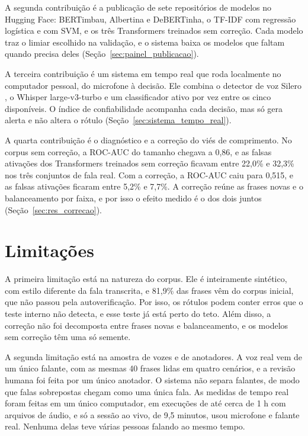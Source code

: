 \documentclass[
    12pt,                %
    openright,           %
    oneside,             %
    a4paper,             %
    english,             %
    brazil               %
]{abntex2}
\begin{document}
A segunda contribuição é a publicação de sete repositórios de modelos no Hugging Face: BERTimbau, Albertina e DeBERTinha, o TF-IDF com regressão logística e com SVM, e os três Transformers treinados sem correção. Cada modelo traz o limiar escolhido na validação, e o sistema baixa os modelos que faltam quando precisa deles (Seção~\ref{sec:painel_publicacao}).

A terceira contribuição é um sistema em tempo real que roda localmente no computador pessoal, do microfone à decisão. Ele combina o detector de voz Silero \cite{Silero2026}, o Whisper large-v3-turbo \cite{Radford2023, OpenAI2024Turbo} e um classificador ativo por vez entre os cinco disponíveis. O índice de confiabilidade acompanha cada decisão, mas só gera alerta e não altera o rótulo (Seção~\ref{sec:sistema_tempo_real}).

A quarta contribuição é o diagnóstico e a correção do viés de comprimento. No corpus sem correção, a ROC-AUC do tamanho chegava a 0,86, e as falsas ativações dos Transformers treinados sem correção ficavam entre 22,0\% e 32,3\% nos três conjuntos de fala real. Com a correção, a ROC-AUC caiu para 0,515, e as falsas ativações ficaram entre 5,2\% e 7,7\%. A correção reúne as frases novas e o balanceamento por faixa, e por isso o efeito medido é o dos dois juntos (Seção~\ref{sec:res_correcao}).


\section{Limitações}

A primeira limitação está na natureza do corpus. Ele é inteiramente sintético, com estilo diferente da fala transcrita, e 81,9\% das frases vêm do corpus inicial, que não passou pela autoverificação. Por isso, os rótulos podem conter erros que o teste interno não detecta, e esse teste já está perto do teto. Além disso, a correção não foi decomposta entre frases novas e balanceamento, e os modelos sem correção têm uma só semente.

A segunda limitação está na amostra de vozes e de anotadores. A voz real vem de um único falante, com as mesmas 40 frases lidas em quatro cenários, e a revisão humana foi feita por um único anotador. O sistema não separa falantes, de modo que falas sobrepostas chegam como uma única fala. As medidas de tempo real foram feitas em um único computador, em execuções de até cerca de 1 h com arquivos de áudio, e só a sessão ao vivo, de 9,5 minutos, usou microfone e falante real. Nenhuma delas teve várias pessoas falando ao mesmo tempo.
\end{document}
